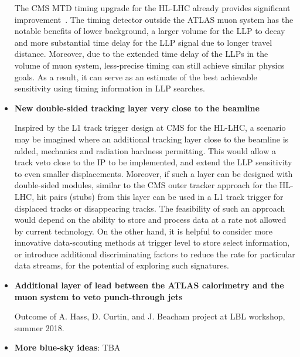 \begin{itemize}
The CMS MTD timing upgrade for the HL-LHC already provides significant improvement~\cite{Liu:2018wte}. The timing detector outside the ATLAS muon system has the notable benefits of lower background, a larger volume for the LLP to decay and more substantial time delay for the LLP signal due to longer travel distance. 
Moreover, due to the extended time delay of the LLPs in the volume of muon system, less-precise timing can still achieve similar physics goals.  As a result, it can serve as an estimate of the best achievable sensitivity using timing information in LLP searches. 

\item \textbf{New double-sided tracking layer very close to the beamline}

Inspired by the L1 track trigger design at CMS for the HL-LHC, a scenario may be imagined where an additional tracking layer close to the beamline is added, mechanics and radiation hardness permitting. This would allow a track veto close to the IP to be implemented, and extend the LLP sensitivity to even smaller displacements. Moreover, if such a layer can be designed with double-sided modules, similar to the CMS outer tracker approach for the HL-LHC, hit pairs (stubs) from this layer can be used in a L1 track trigger for displaced tracks or disappearing tracks. The feasibility of such an approach would depend on the ability to store and process data at a rate not allowed by current technology. On the other hand, it is helpful to consider more innovative data-scouting methods at trigger level to store select information, or introduce additional discriminating factors to reduce the rate for particular data streams, for the potential of exploring such signatures. 

\item \textbf{Additional layer of lead between the ATLAS calorimetry and the muon system to veto punch-through jets}

Outcome of A. Hass, D. Curtin, and J. Beacham project at LBL workshop, summer 2018.

\item \textbf{More blue-sky ideas}: TBA


\end{itemize}
